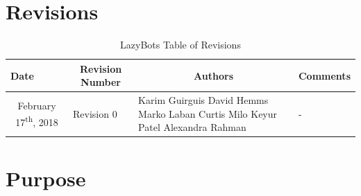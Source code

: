\documentclass [10pt]{article}
\begin{document}

\pagebreak


\tableofcontents
\listoftables
\listoffigures



\pagebreak


\section{Revisions}
\begin{longtable}{| p{ } | p{ } | p{ } | p{ } |} \caption{LazyBots Table of Revisions}  \\

\hline 
\centering \textbf{Date} & 
\multicolumn{1}{c|}{\textbf {Revision Number}} &
\multicolumn{1}{c|}{\textbf {Authors}} & 
\multicolumn{1}{c|}{\textbf {Comments}} \\ \hline


\multicolumn{1}{|c|}{\multirow{1}{*}{\centering February 17\textsuperscript{th}, 2018}}  & 
\multirow{4}{*}{Revision 0}& 
		{Karim Guirguis \newline
		David Hemms \newline
		Marko Laban \newline
		Curtis Milo \newline
		Keyur Patel \newline
		Alexandra Rahman}
 &
 
\multirow{4}{*}{-} \\ 
\hline 

\end{longtable}



\pagebreak




\section {Purpose}
\end{document}
